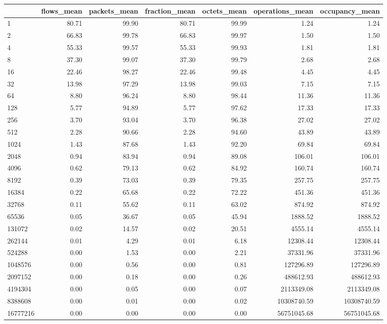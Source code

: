 \begin{tabular}{lrrrrrr}
\toprule
 & flows_mean & packets_mean & fraction_mean & octets_mean & operations_mean & occupancy_mean \\
\midrule
1 & 80.71 & 99.90 & 80.71 & 99.99 & 1.24 & 1.24 \\
2 & 66.83 & 99.78 & 66.83 & 99.97 & 1.50 & 1.50 \\
4 & 55.33 & 99.57 & 55.33 & 99.93 & 1.81 & 1.81 \\
8 & 37.30 & 99.07 & 37.30 & 99.79 & 2.68 & 2.68 \\
16 & 22.46 & 98.27 & 22.46 & 99.48 & 4.45 & 4.45 \\
32 & 13.98 & 97.29 & 13.98 & 99.03 & 7.15 & 7.15 \\
64 & 8.80 & 96.24 & 8.80 & 98.44 & 11.36 & 11.36 \\
128 & 5.77 & 94.89 & 5.77 & 97.62 & 17.33 & 17.33 \\
256 & 3.70 & 93.04 & 3.70 & 96.38 & 27.02 & 27.02 \\
512 & 2.28 & 90.66 & 2.28 & 94.60 & 43.89 & 43.89 \\
1024 & 1.43 & 87.68 & 1.43 & 92.20 & 69.84 & 69.84 \\
2048 & 0.94 & 83.94 & 0.94 & 89.08 & 106.01 & 106.01 \\
4096 & 0.62 & 79.13 & 0.62 & 84.92 & 160.74 & 160.74 \\
8192 & 0.39 & 73.03 & 0.39 & 79.35 & 257.75 & 257.75 \\
16384 & 0.22 & 65.68 & 0.22 & 72.22 & 451.36 & 451.36 \\
32768 & 0.11 & 55.62 & 0.11 & 63.02 & 874.92 & 874.92 \\
65536 & 0.05 & 36.67 & 0.05 & 45.94 & 1888.52 & 1888.52 \\
131072 & 0.02 & 14.57 & 0.02 & 20.51 & 4555.14 & 4555.14 \\
262144 & 0.01 & 4.29 & 0.01 & 6.18 & 12308.44 & 12308.44 \\
524288 & 0.00 & 1.53 & 0.00 & 2.21 & 37331.96 & 37331.96 \\
1048576 & 0.00 & 0.56 & 0.00 & 0.81 & 127296.89 & 127296.89 \\
2097152 & 0.00 & 0.18 & 0.00 & 0.26 & 488612.93 & 488612.93 \\
4194304 & 0.00 & 0.05 & 0.00 & 0.07 & 2113349.08 & 2113349.08 \\
8388608 & 0.00 & 0.01 & 0.00 & 0.02 & 10308740.59 & 10308740.59 \\
16777216 & 0.00 & 0.00 & 0.00 & 0.00 & 56751045.68 & 56751045.68 \\
\bottomrule
\end{tabular}
